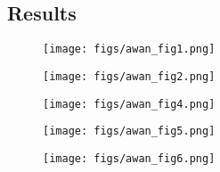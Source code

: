 






\subsection{Results}
\label{sec:\secname:results}




\begin{figure}[tbh!]
\vskip -0.1in
\texttt{[image: figs/awan\_fig1.png]}
\caption{}
\label{fig:seasonal_dithers}
\end{figure}

\begin{figure}[tbh!]
\vskip -0.1in
\texttt{[image: figs/awan\_fig2.png]}
\caption{}
\label{fig:nightly_dithers}
\end{figure}

\begin{figure}[tbh!]
\vskip -0.1in
\texttt{[image: figs/awan\_fig4.png]}
\caption{}
\label{fig:dithering_histograms}
\end{figure}

\begin{figure}[tbh!]
\vskip -0.1in
\texttt{[image: figs/awan\_fig5.png]}
\caption{}
\label{fig:dithering_skymaps}
\end{figure}

\begin{figure}[tbh!]
\vskip -0.1in
\texttt{[image: figs/awan\_fig6.png]}
\caption{}
\label{fig:dithering_power_spectra}
\end{figure}




